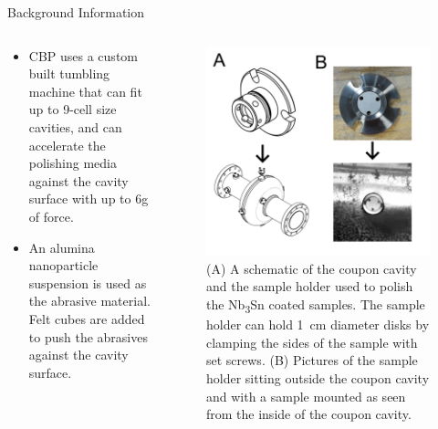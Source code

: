 \documentclass{beamer}
\begin{document}
\begin{frame}{}
\begin{columns}[t]
\begin{column}{0.32\linewidth}
\begin{block}{\label{sec:backgroundinformation}Background Information}
\begin{columns}[t]
\begin{column}{0.45\columnwidth}
\begin{itemize}
                                \item CBP uses a custom built tumbling machine that can fit up to 9-cell size cavities, and can accelerate the polishing media against the cavity surface with up to 6g of force.
                                \item An alumina nanoparticle suspension is used as the abrasive material. Felt cubes are added to push the abrasives against the cavity surface.
                            \end{itemize}  
                        \end{column}
                        \begin{column}{0.45\columnwidth}
                            \begin{figure}[t]%
                                \centering%
                                \includegraphics[width=\columnwidth]{../doc/figs/Coupon_Cavity.png}%
                                \caption{(A) A schematic of the coupon cavity and the sample holder used to polish the Nb\textsubscript{3}Sn coated samples. The sample holder can hold 1~cm diameter disks by clamping the sides of the sample with set screws. (B) Pictures of the sample holder sitting outside the coupon cavity and with a sample mounted as seen from the inside of the coupon cavity.}%
                                \label{fig:couponcavity}%
                            \end{figure}
                        \end{column}
                    \end{columns}
                \end{block}
            \end{column}






\end{columns}
\end{frame}
\end{document}

